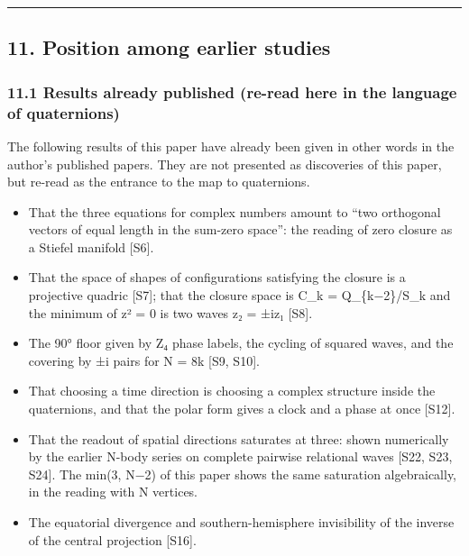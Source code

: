 \documentclass[
  a4paper,
]{article}
\providecommand{\tightlist}{%
  \setlength{\itemsep}{0pt}\setlength{\parskip}{0pt}}
\begin{document}
\begin{center}\rule{0.5\linewidth}{0.5pt}\end{center}

\subsection{11. Position among earlier
studies}\label{position-among-earlier-studies}

\subsubsection{11.1 Results already published (re-read here in the
language of
quaternions)}\label{results-already-published-re-read-here-in-the-language-of-quaternions}

The following results of this paper have already been given in other
words in the author's published papers. They are not presented as
discoveries of this paper, but re-read as the entrance to the map to
quaternions.

\begin{itemize}
\tightlist
\item
  That the three equations for complex numbers amount to ``two
  orthogonal vectors of equal length in the sum-zero space'': the
  reading of zero closure as a Stiefel manifold {[}S6{]}.
\item
  That the space of shapes of configurations satisfying the closure is a
  projective quadric {[}S7{]}; that the closure space is C\_k =
  Q\_\{k−2\}/S\_k and the minimum of z² = 0 is two waves z₂ = ±iz₁
  {[}S8{]}.
\item
  The 90° floor given by Z₄ phase labels, the cycling of squared waves,
  and the covering by ±i pairs for N = 8k {[}S9, S10{]}.
\item
  That choosing a time direction is choosing a complex structure inside
  the quaternions, and that the polar form gives a clock and a phase at
  once {[}S12{]}.
\item
  That the readout of spatial directions saturates at three: shown
  numerically by the earlier N-body series on complete pairwise
  relational waves {[}S22, S23, S24{]}. The min(3, N−2) of this paper
  shows the same saturation algebraically, in the reading with N
  vertices.
\item
  The equatorial divergence and southern-hemisphere invisibility of the
  inverse of the central projection {[}S16{]}.
\end{itemize}
\end{document}
